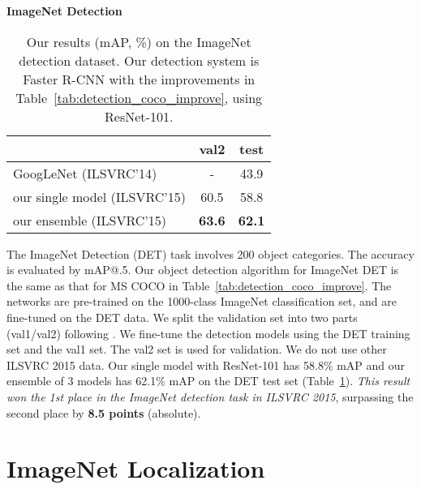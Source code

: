 \documentclass{article}
\renewcommand\arraystretch{1.2}
\begin{document}
\vspace{1em}
\noindent\textbf{ImageNet Detection}

\renewcommand\arraystretch{1.2}
\setlength{\tabcolsep}{10pt}
\begin{table}[t]
\begin{center}
\small
\begin{tabular}{l|c|c}
\hline
  & val2 & test \\
\hline
GoogLeNet \cite{Szegedy2015} (ILSVRC'14) & - & 43.9 \\
\hline
our single model (ILSVRC'15) & 60.5 & 58.8  \\
our ensemble (ILSVRC'15) & \textbf{63.6} & \textbf{62.1} \\
\hline
\end{tabular}
\end{center}
\vspace{-.5em}
\caption{Our results (mAP, \%) on the ImageNet detection dataset. Our detection system is Faster R-CNN \cite{Ren2015} with the improvements in Table~\ref{tab:detection_coco_improve}, using ResNet-101.
}
\vspace{-.5em}
\label{tab:imagenet_det}
\end{table}

The ImageNet Detection (DET) task involves 200 object categories. The accuracy is evaluated by mAP@.5.
Our object detection algorithm for ImageNet DET is the same as that for MS COCO in Table~\ref{tab:detection_coco_improve}. The networks are pre-trained on the 1000-class ImageNet classification set, and are fine-tuned on the DET data. We split the validation set into two parts (val1/val2) following \cite{Girshick2014}. We fine-tune the detection models using the DET training set and the val1 set. The val2 set is used for validation. We do not use other ILSVRC 2015 data. Our single model with ResNet-101 has 58.8\% mAP and our ensemble of 3 models has 62.1\% mAP on the DET test set (Table~\ref{tab:imagenet_det}). \emph{This result won the 1st place in the ImageNet detection task in ILSVRC 2015}, surpassing the second place by \textbf{8.5 points} (absolute).


\section{ImageNet Localization}
\label{sec:appendix_localization}
\end{document}

